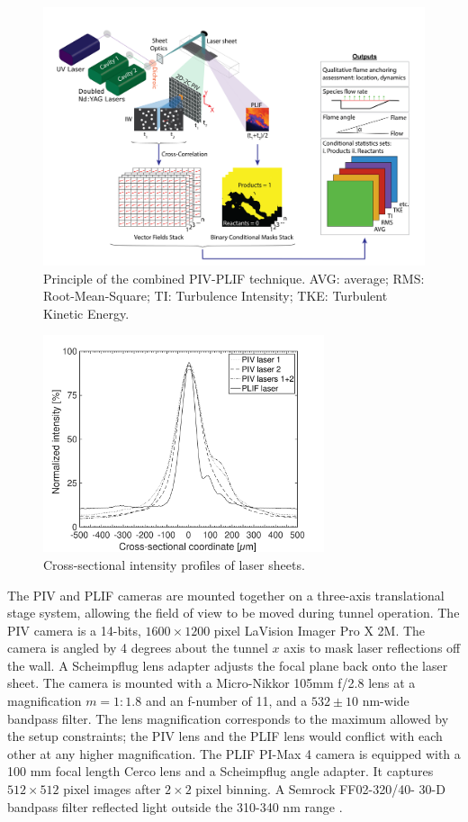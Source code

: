\begin{figure}
\centering
\includegraphics[width=6.5in, trim=0.6in 0in 0.7in 0in, clip]{figures/PIV-PLIFsetup/PIV-PLIFArtboard1@3x.png} %
\caption{Principle of the combined PIV-PLIF technique. AVG: average; RMS: Root-Mean-Square; TI: Turbulence Intensity; TKE: Turbulent Kinetic Energy.}\label{fig:ch3_method_setup}
\end{figure}

\begin{figure}
\centering
\includegraphics[width=3.25in, trim=0.35in 0in 0.75in 0in, clip]{figures/B_f_overlap_all} %
\caption{Cross-sectional intensity profiles of laser sheets.}\label{fig:ch3_meas_LS_thick}
\end{figure}

The PIV and PLIF cameras are mounted together on a three-axis translational stage system, allowing the field of view to be moved during tunnel operation.
The PIV camera is a 14-bits, $1600\times 1200$ pixel LaVision Imager Pro X 2M. The camera is angled by 4 degrees about the tunnel $x$ axis to mask laser reflections off the wall. A Scheimpflug lens adapter adjusts the focal plane back onto the laser sheet. The camera is mounted with a Micro-Nikkor 105mm f/2.8 lens at a magnification $m=1:1.8$ and an f-number of 11, and a $532 \pm 10$ nm-wide bandpass filter. The lens magnification corresponds to the maximum allowed by the setup constraints; the PIV lens and the PLIF lens would conflict with each other at any higher magnification. The PLIF PI-Max 4 camera is equipped with a 100 mm focal length Cerco lens and a Scheimpflug angle adapter. It captures $512\times 512$ pixel images after $2\times2$ pixel binning. A Semrock FF02-320/40- 30-D bandpass filter reflected light outside the 310-340 nm range \citep{GeipelRockwellChelliahEtAl2017}. 

